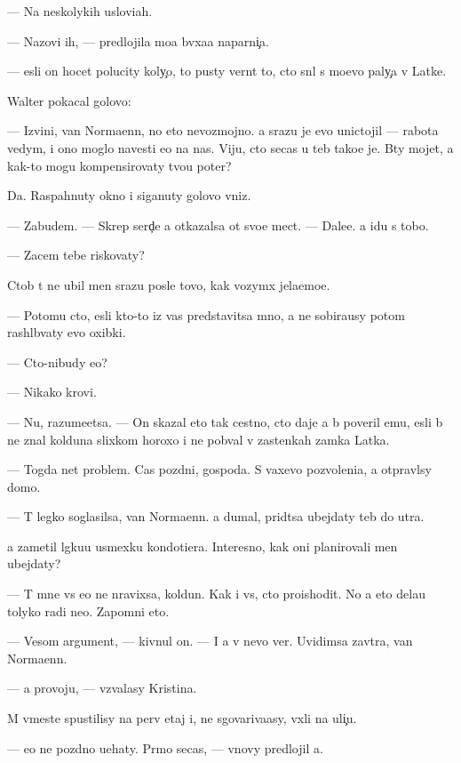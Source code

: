 \documentclass[10pt]{book}
\begin{document}
— Na neskolykih uslovi{\y}ah.

— Nazovi ih, — predlojila mo{\y}a b{\yi}vxa{\y}a naparni{\c}a.

— {\Y}esli on hocet polucity koly{\c}o, to pusty vern{\e}t to, cto sn{\ia}l s mo{\y}evo paly{\c}a v Latke.

Walter pokacal golovo{\y}:

— Izvini, van Normaenn, no eto nevozmojno. {\Y}a srazu je {\y}evo unictojil — rabota vedym{\yi}, i ono moglo navesti {\y}e{\y}o na nas. Viju, cto se{\y}cas u teb{\ia} tako{\y}e je. B{\yi}ty mojet, {\y}a kak-to mogu kompensirovaty tvo{\y}u poter{\iu}?

Da. Raspahnuty okno i siganuty golovo{\y} vniz.

— Zabudem. — Skrep{\ia} serd{\c}e {\y}a otkazalsa ot svo{\y}e{\y} mect{\yi}. — Dale{\y}e. {\Y}a idu s tobo{\y}.

— Zacem tebe riskovaty?

Ctob{\yi} t{\yi} ne ubil men{\ia} srazu posle tovo, kak vozym{\e}x jela{\y}emo{\y}e.

— Potomu cto, {\y}esli kto-to iz vas predstavitsa mno{\y}, {\y}a ne sobira{\y}usy potom rashl{\e}b{\yi}vaty {\y}evo oxibki.

— Cto-nibudy {\y}e{\x}o?

— Nikako{\y} krovi.

— Nu, razume{\y}etsa. — On skazal eto tak cestno, cto daje {\y}a b{\yi} poveril {\y}emu, {\y}esli b{\yi} ne znal kolduna slixkom horoxo i ne pob{\yi}val v zastenkah zamka Latka.

— Togda net problem. Cas pozdni{\y}, gospoda. S vaxevo pozvoleni{\y}a, {\y}a otpravl{\iu}sy domo{\y}.

— T{\yi} legko soglasilsa, van Normaenn. {\Y}a dumal, prid{\e}tsa ubejdaty teb{\ia} do utra.

{\Y}a zametil l{\e}gku{\y}u usmexku kondotiera. Interesno, kak oni planirovali men{\ia} ubejdaty?

— T{\yi} mne vs{\e} {\y}e{\x}o ne nravixsa, koldun. Kak i vs{\e}, cto proishodit. No {\y}a eto dela{\y}u tolyko radi ne{\y}o. Zapomni eto.

— Vesom{\yi}{\y} argument, — kivnul on. — I {\y}a v nevo ver{\iu}. Uvidimsa zavtra, van Normaenn.

— {\Y}a provoju, — v{\yi}zvalasy Kristina.

M{\yi} vmeste spustilisy na perv{\yi}{\y} etaj i, ne sgovariva{\y}asy, v{\yi}xli na uli{\c}u.

— {\Y}e{\x}o ne pozdno u{\y}ehaty. Pr{\ia}mo se{\y}cas, — vnovy predlojil {\y}a.
\end{document}

